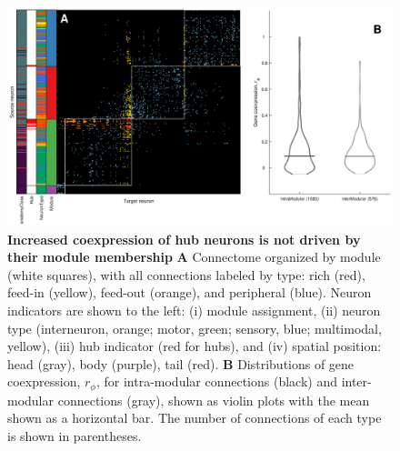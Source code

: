 \documentclass[10pt,letterpaper]{article}
\begin{document}
\begin{figure}[!h]
\centering
    \includegraphics[width=1.2\textwidth]{Modules.eps}
 \caption{
 \textbf{Increased coexpression of hub neurons is not driven by their module membership}
\textbf{A} Connectome organized by module (white squares), with all connections labeled by type: rich (red), feed-in (yellow), feed-out (orange), and peripheral (blue).
Neuron indicators are shown to the left:
(i) module assignment,
(ii) neuron type (interneuron, orange; motor, green; sensory, blue; multimodal, yellow),
(iii) hub indicator (red for hubs), and
(iv) spatial position: head (gray), body (purple), tail (red).
\textbf{B} Distributions of gene coexpression, $r_\phi$, for intra-modular connections (black) and inter-modular connections (gray), shown as violin plots with the mean shown as a horizontal bar.
The number of connections of each type is shown in parentheses.
}
\end{figure}
\end{document}

